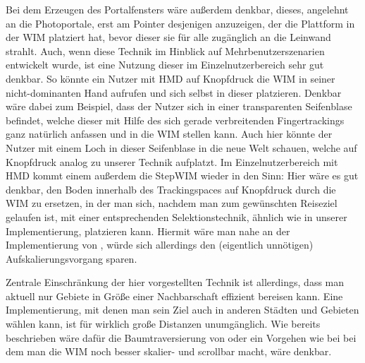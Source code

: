 Bei dem Erzeugen des Portalfensters wäre außerdem denkbar, dieses, angelehnt an die Photoportale, erst am Pointer desjenigen anzuzeigen, der die Plattform in der WIM platziert hat, bevor dieser sie für alle zugänglich an die Leinwand strahlt.
Auch, wenn diese Technik im Hinblick auf Mehrbenutzerszenarien entwickelt wurde, ist eine Nutzung dieser im Einzelnutzerbereich sehr gut denkbar. So könnte ein Nutzer mit HMD auf Knopfdruck die WIM in seiner nicht-dominanten Hand aufrufen und sich selbst in dieser platzieren. Denkbar wäre dabei zum Beispiel, dass der Nutzer sich in einer transparenten \glqq Seifenblase\grqq{} befindet, welche dieser mit Hilfe des sich gerade verbreitenden Fingertrackings ganz natürlich anfassen und in die WIM stellen kann. Auch hier könnte der Nutzer mit einem Loch in dieser \glqq Seifenblase\grqq{} in die neue Welt schauen, welche auf Knopfdruck analog zu unserer Technik \glqq aufplatzt\grqq{}. Im Einzelnutzerbereich mit HMD kommt einem außerdem die StepWIM \cite{Stoakley2010VirtualWIM} wieder in den Sinn:
Hier wäre es gut denkbar, den Boden innerhalb des Trackingspaces auf Knopfdruck durch die WIM zu ersetzen, in der man sich, nachdem man zum gewünschten Reiseziel gelaufen ist, mit einer entsprechenden Selektionstechnik, ähnlich wie in unserer Implementierung, platzieren kann.
Hiermit wäre man nahe an der Implementierung von \cite{Krekhov2018GulliVR}, würde sich allerdings den (eigentlich unnötigen) Aufskalierungsvorgang sparen.

Zentrale Einschränkung der hier vorgestellten Technik ist allerdings, dass man aktuell nur Gebiete in Größe einer Nachbarschaft effizient bereisen kann. Eine Implementierung, mit denen man sein Ziel auch in anderen Städten und Gebieten wählen kann, ist für wirklich große Distanzen unumgänglich. Wie bereits beschrieben wäre dafür die Baumtraversierung von \cite{pierce_representations} oder ein Vorgehen wie bei \cite{wingrave2006overcoming} bei dem man die WIM noch besser skalier- und scrollbar macht, wäre denkbar.
